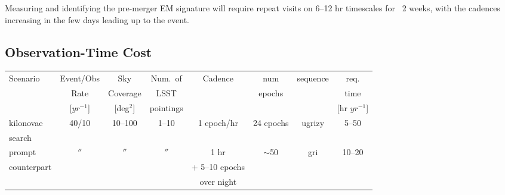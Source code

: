 \documentclass [11pt]{article}
\begin{document}
Measuring and identifying the pre-merger EM signature will require repeat visits on 6--12 hr timescales for ~2 weeks, with the cadences increasing in the few days leading up to the event.
%
%  
%
%
%

\subsection{Observation-Time Cost}


\begin{tabular}{lccccccc}
\hline
Scenario & Event/Obs  & Sky & Num.\ of & Cadence & num  & sequence & req.\\
         & Rate  & Coverage & LSST & & epochs & & time\\
         & [$yr^{-1}$]   &  [deg$^2$]  &   pointings & & & & [hr $yr^{-1}$] \\
\hline\hline
kilonovae & 40/10 & 10--100 & 1--10 & 1 epoch/hr & 24 epochs & ugrizy & 5--50 \\
search \\
\hline
prompt    &    $''$     &   $''$       &   $''$     & 1 hr  &  $\sim$50 & gri  & 10--20 \\
counterpart &        &         &      & + 5--10 epochs  \\
            &        &         &      &  over night     \\
\hline
\end{tabular}
\end{document}
